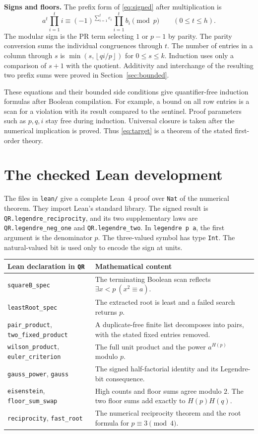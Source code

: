 \documentclass[12pt,letterpaper]{article}
\newcommand{\sect}[1]{\section{\texorpdfstring{\color{accent}#1}{#1}}}
\newcommand{\lab}[1]{\textbf{#1.}\enspace}
\newcommand{\floor}[1]{\left\lfloor#1\right\rfloor}
\newcommand{\code}[1]{\texttt{#1}}
\begin{document}
\lab{Signs and floors} The prefix form of \eqref{eq:signed} after multiplication is
\[
  a^t\prod_{i=1}^t i\equiv
  (-1)^{\sum_{i=1}^{t} e_i}\prod_{i=1}^t b_i\pmod p
       \qquad(0\le t\le h).
\]
The modular sign is the PR term selecting $1$ or $p-1$ by parity. The parity conversion sums the individual congruences through $t$. The number of entries in a column through $s$ is $\min(s,\floor{qi/p})$ for $0\le s\le k$. Induction uses only a comparison of $s+1$ with the quotient. Additivity and interchange of the resulting two prefix sums were proved in Section~\ref{sec:bounded}.

These equations and their bounded side conditions give quantifier-free induction formulas after Boolean compilation. For example, a bound on all row entries is a scan for a violation with its result compared to the sentinel. Proof parameters such as $p,q,i$ stay free during induction. Universal closure is taken after the numerical implication is proved. Thus \eqref{eq:target} is a theorem of the stated first-order theory.
\clearpage
\sect{The checked Lean development}\label{sec:lean}
The files in \code{lean/} give a complete Lean~4 proof over \code{Nat} of the numerical theorem. They import Lean's standard library. The signed result is \code{QR.legendre\_reciprocity}, and its two supplementary laws are \code{QR.legendre\_neg\_one} and \code{QR.legendre\_two}. In \code{legendre p a}, the first argument is the denominator $p$. The three-valued symbol has type \code{Int}. The natural-valued bit is used only to encode the sign at units.
\begin{center}\small\renewcommand{\arraystretch}{1.12}
\begin{tabular}{@{}>{\raggedright\arraybackslash}p{.33\linewidth}>{\raggedright\arraybackslash}p{.61\linewidth}@{}}\toprule
\textbf{Lean declaration in \code{QR}} & \textbf{Mathematical content}\\\midrule
\code{squareB\_spec} & The terminating Boolean scan reflects $\exists x<p\ (x^2\equiv a)$.\\
\code{leastRoot\_spec} & The extracted root is least and a failed search returns $p$.\\
\code{pair\_product}, \code{two\_fixed\_product} & A duplicate-free finite list decomposes into pairs, with the stated fixed entries removed.\\
\code{wilson\_product}, \code{euler\_criterion} & The full unit product and the power $a^{H(p)}$ modulo $p$.\\
\code{gauss\_power}, \code{gauss} & The signed half-factorial identity and its Legendre-bit consequence.\\
\code{eisenstein}, \code{floor\_sum\_swap} & High counts and floor sums agree modulo $2$. The two floor sums add exactly to $H(p)H(q)$.\\
\code{reciprocity}, \code{fast\_root} & The numerical reciprocity theorem and the root formula for $p\equiv3\pmod4$.\\\bottomrule
\end{tabular}\end{center}
\end{document}
